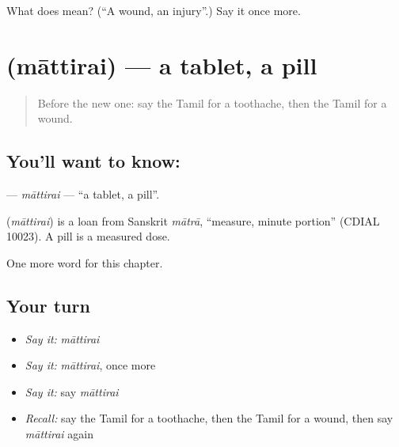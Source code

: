 \begin{tcolorbox}[breakable,colback=teal!4,colframe=teal!35!black,title={Before you move on}]
What does  mean? (\textquotedblleft{}A wound, an injury\textquotedblright{}.) Say it once more.
\end{tcolorbox}
\section[\texorpdfstring{\ta{மாத்திரை} (māttirai)}{மாத்திரை (māttirai)}]{ (māttirai) — a tablet, a pill}

\label{lesson:TA-C232-mattirai}



\begin{quote}
Before the new one: say the Tamil for a toothache, then the Tamil for a wound.
\end{quote}

\subsection*{You'll want to know: }
\textbf{} — \emph{māttirai} — \textquotedblleft{}a tablet, a pill\textquotedblright{}.

\begin{cousinweb}
\textbf{} (\emph{māttirai}) is a loan from Sanskrit \emph{mātrā}, \textquotedblleft{}measure, minute portion\textquotedblright{} (CDIAL 10023). A pill is a measured dose.
\end{cousinweb}

\begin{grammarlens}[title={What you've built}]
One more word for this chapter.
\end{grammarlens}

\subsection*{Your turn}
\begin{itemize}
\raggedright
  \item \emph{Say it:} \emph{māttirai}
  \item \emph{Say it:} \emph{māttirai}, once more
  \item \emph{Say it:} say \emph{māttirai}
  \item \emph{Recall:} say the Tamil for a toothache, then the Tamil for a wound, then say \emph{māttirai} again
\end{itemize}


